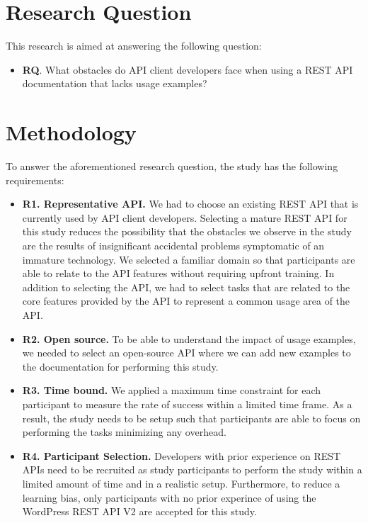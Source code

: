 \section{Research Question}
\label{sec:goal}
This research is aimed at answering the following question:

\begin{itemize}
  \item \textbf{RQ}. What obstacles do API client developers face when using a REST API documentation that lacks usage examples?
\end{itemize}

\section{Methodology} %
\label{sec:method}

To answer the aforementioned research question, the study has the following requirements:

\begin{itemize}
  \item \textbf{R1. Representative API.} We had to choose an existing REST API that is currently used by API client developers. Selecting a mature REST API for this study reduces the possibility that the obstacles we observe in the study are the results of insignificant accidental problems symptomatic of an immature technology. We selected a familiar domain so that participants are able to relate to the API features without requiring upfront training. In addition to selecting the API, we had to select tasks that are related to the core features provided by the API to represent a common usage area of the API.
  \item \textbf{R2. Open source.} To be able to understand the impact of usage examples, we needed to select an open-source API where we can add new examples to the documentation for performing this study.
  \item \textbf{R3. Time bound.} We applied a maximum time constraint for each participant to measure the rate of success within a limited time frame. As a result, the study needs to be setup such that participants are able to focus on performing the tasks minimizing any overhead.
  \item \textbf{R4. Participant Selection.} Developers with prior experience on REST APIs need to be recruited as study participants to perform the study within a limited amount of time and in a realistic setup. Furthermore, to reduce a learning bias, only participants with no prior experince of using the WordPress REST API V2 are accepted for this study.
\end{itemize}


